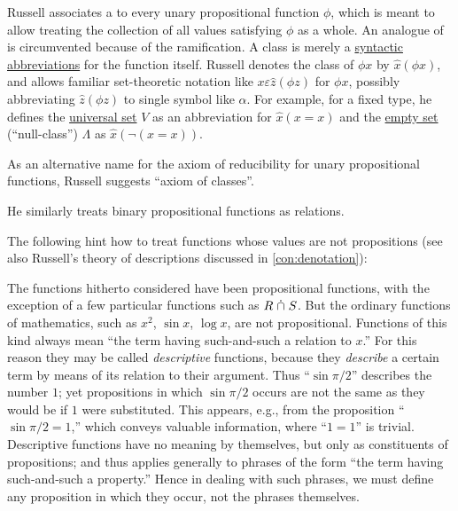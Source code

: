 \begin{remark}
\begin{thmenum}
    Russell associates a  to every unary propositional function \( \phi \), which is meant to allow treating the collection of all values satisfying \( \phi \) as a whole. An analogue of  is circumvented because of the ramification. A class is merely a \hyperref[con:syntactic_abbreviation]{syntactic abbreviations} for the function itself. Russell denotes the class of \( \phi x \) by \( \hat x (\phi x) \), and allows familiar set-theoretic notation like \( x \varepsilon \hat z (\phi z) \) for \( \phi x \), possibly abbreviating \( \hat z (\phi z) \) to single symbol like \( \alpha \). For example, for a fixed type, he defines the \hyperref[con:universal_set]{universal set} \( V \) as an abbreviation for \( \hat x (x = x) \) and the \hyperref[def:empty_set]{empty set} (\enquote{null-class}) \( \Lambda \) as \( \hat x (\neg (x = x)) \).

    As an alternative name for the axiom of reducibility for unary propositional functions, Russell suggests \enquote{axiom of classes}.

    He similarly treats binary propositional functions as relations.

     The following hint how to treat functions whose values are not propositions (see also Russell's theory of descriptions discussed in \cref{con:denotation}):
    \begin{displayquote}
      The functions hitherto considered have been propositional functions, with the exception of a few particular functions such as \( R \mathrel{\dot{\cap}} S \). But the ordinary functions of mathematics, such as \( x^2 \), \( \sin x \), \( \log x \), are not propositional. Functions of this kind always mean \enquote{the term having such-and-such a relation to \( x \).} For this reason they may be called \textit{descriptive} functions, because they \textit{describe} a certain term by means of its relation to their argument. Thus \enquote{\( \sin \pi / 2 \)} describes the number \( 1 \); yet propositions in which \( \sin \pi / 2 \) occurs are not the same as they would be if \( 1 \) were substituted. This appears, e.g., from the proposition \enquote{\( \sin \pi / 2 = 1 \),} which conveys valuable information, where \enquote{\( 1 = 1 \)} is trivial. Descriptive functions have no meaning by themselves, but only as constituents of propositions; and thus applies generally to phrases of the form \enquote{the term having such-and-such a property.} Hence in dealing with such phrases, we must define any proposition in which they occur, not the phrases themselves.
    \end{displayquote}


\end{thmenum}
\end{remark}
